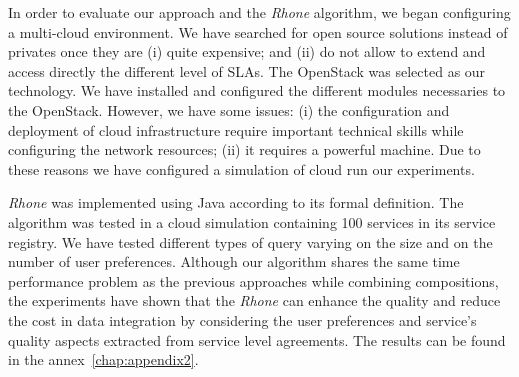 \bigskip
In order to evaluate our approach and the \textit{Rhone} algorithm, we began configuring a multi-cloud environment. We have searched for open source solutions instead of privates once they are (i) quite expensive; and (ii) do not allow to extend and access directly the different level of SLAs. The OpenStack was selected as our technology. We have installed and configured the different modules necessaries to the OpenStack. However, we have some issues: (i) the configuration and deployment of cloud infrastructure require important technical skills while configuring the network resources; (ii) it requires a powerful machine. Due to these reasons we have configured a simulation of cloud run our experiments.

\textit{Rhone} was implemented using Java according to its formal definition. The algorithm was tested in a cloud simulation containing 100 services in its service registry. We have tested different types of query varying on the size and on the number of user preferences. Although our algorithm shares the same time performance problem as the previous approaches while combining compositions, the experiments have shown that the \textit{Rhone} can enhance the quality and reduce the cost in data integration by considering the user preferences and service's quality aspects extracted from service level agreements.
The results can be found in the annex~\ref{chap:appendix2}.
 


